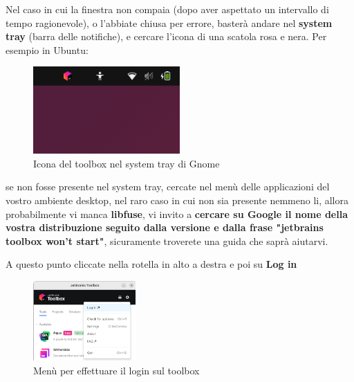             \begin{warningbox}
                Nel caso in cui la finestra non compaia (dopo aver aspettato un intervallo di tempo ragionevole), o l'abbiate chiusa per errore, 
                basterà andare nel \textbf{system tray} (barra delle notifiche), e cercare l'icona di una scatola rosa e nera. Per esempio in Ubuntu:
                \begin{figure}[H]
                    \centering
                    \graphicspath{{src/capitoli/04/img/}}
                    \includegraphics[width=0.5\textwidth]{barra-toolbox.png}
                    \caption{Icona del toolbox nel system tray di Gnome}
                    \label{fig:Icona del toolbox nel system tray di Gnome}
                \end{figure}
                se non fosse presente nel system tray, cercate nel menù delle applicazioni del vostro ambiente desktop, nel raro caso in cui non sia presente 
                nemmeno li, allora probabilmente vi manca \textbf{libfuse}, vi invito a \textbf{cercare su Google il nome della vostra distribuzione seguito dalla versione 
                e dalla frase "jetbrains toolbox won't start"}, sicuramente troverete una guida che saprà aiutarvi.
            \end{warningbox}
            A questo punto cliccate nella rotella in alto a destra e poi su \textbf{Log in}
            \begin{figure}[H]
                \centering
                \graphicspath{{src/capitoli/04/img/}}
                \includegraphics[width=0.35\textwidth]{toolbox-login.png}
                \caption{Menù per effettuare il login sul toolbox}
                \label{fig:Menù per effettuare il login sul toolbox}
            \end{figure}